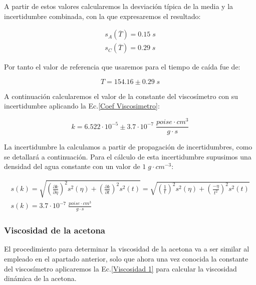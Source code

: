 \documentclass[a4paper,12pt,titlepage]{article}
\begin{document}
    A partir de estos valores calcularemos la desviación típica de la media y la incertidumbre combinada, con la que expresaremos el resultado:
    
    \begin{equation}
        \begin{gathered}
            s_A(\overline{T}) = 0.15 \; s \\
            s_C(\overline{T}) = 0.29 \; s
        \end{gathered}
    \end{equation}
    
Por tanto el valor de referencia que usaremos para el tiempo de caída fue de:
    
\begin{equation}
    T = 154.16 \pm 0.29 \; s
\end{equation}

A continuación calcularemos el valor de la constante del viscosímetro con su incertidumbre aplicando la Ec.\ref{Coef Viscosimetro}:

\begin{equation}
    k = 6.522 \cdot 10^{-5 }\pm 3.7 \cdot 10^{-7} \; \frac{poise\cdot cm^3}{g\cdot s}
\end{equation}

La incertidumbre la calculamos a partir de propagación de incertidumbres, como se detallará a continuación. Para el cálculo de esta incertidumbre supusimos una densidad del agua constante con un valor de $1 \; g\cdot cm^{-3}$:

\begin{equation}
    \begin{gathered}
        s(k) = \sqrt{\left (\frac{\partial k}{\partial \eta }\right )^2 s^2(\eta) + \left (\frac{\partial k}{\partial t}\right )^2s^2(t)} = \sqrt{\left (\frac{1}{t}\right )^2s^2(\eta) + \left (\frac{-\eta}{t^2}\right )^2s^2(t)} \\ s(k) = 3.7 \cdot 10^{-7} \; \frac{poise\cdot cm^3}{g\cdot s}
    \end{gathered}
\end{equation}

\subsubsection{Viscosidad de la acetona}

El procedimiento para determinar la viscosidad de la acetona va a ser similar al empleado en el apartado anterior, solo que ahora una vez conocida la constante del viscosímetro aplicaremos la Ec.\ref{Viscosidad 1} para calcular la viscosidad dinámica de la acetona.
\end{document}

